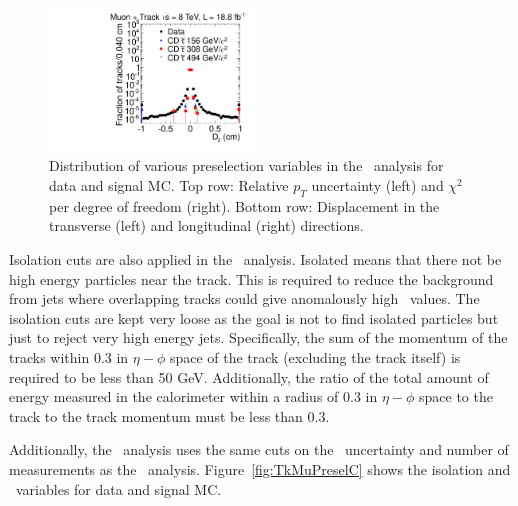 \begin{figure}
  \includegraphics[clip=false, trim=0.0cm 0cm 0.0cm 0cm, width=0.48\textwidth]{figures/tkmu/Selection_Comp_8TeV_GMStau_Dz_BS}
  \caption[Distribution of relative \pt\ uncertainty, $\chi^2$ per degree of freedom, and transverse and longitudinal
displacement in the \tktof\ analysis for data and signal MC.]
{Distribution of various preselection variables in the \tktof\ analysis for data and signal MC.
Top row: Relative $p_T$ uncertainty (left) and $\chi^2$ per degree of freedom (right).
Bottom row: Displacement in the transverse (left) and longitudinal (right) directions.}
    \label{fig:TkMuPreselB}
\end{figure}

Isolation cuts are also applied in the \tktof\ analysis. Isolated means that there not be high energy particles near the track.
This is required to reduce the background from jets where overlapping tracks could give
anomalously high \dedx\ values. The isolation cuts are kept very loose as the goal is not to find isolated particles but just to reject very high energy jets.
Specifically, the sum of the momentum of the tracks within 0.3 in $\eta-\phi$ 
space of the track (excluding the track itself) is required to be less than 50 GeV. Additionally, the ratio of the total
amount of energy measured in the calorimeter within a radius of 0.3 in $\eta-\phi$ space to the track to the track momentum must be less than 0.3.

Additionally, the \tktof\ analysis uses the same cuts on the \invbeta\ uncertainty and number of measurements as the \muononly\ analysis.
Figure~\ref{fig:TkMuPreselC} shows the isolation and \invbeta\ variables for data and signal MC.

